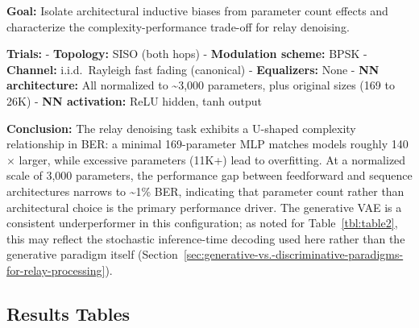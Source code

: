 \textbf{Goal:} Isolate architectural inductive biases from parameter count effects and characterize the complexity-performance trade-off for relay denoising.

\textbf{Trials:} - \textbf{Topology:} SISO (both hops) - \textbf{Modulation scheme:} BPSK - \textbf{Channel:} i.i.d.\ Rayleigh fast fading (canonical) - \textbf{Equalizers:} None - \textbf{NN architecture:} All normalized to \textasciitilde3,000 parameters, plus original sizes (169 to 26K) - \textbf{NN activation:} ReLU hidden, tanh output

\textbf{Conclusion:} The relay denoising task exhibits a U-shaped complexity relationship in BER: a minimal 169-parameter MLP matches models roughly 140$\times$ larger, while excessive parameters (11K+) lead to overfitting. At a normalized scale of 3,000 parameters, the performance gap between feedforward and sequence architectures narrows to \textasciitilde1\% BER, indicating that parameter count rather than architectural choice is the primary performance driver. The generative VAE is a consistent underperformer in this configuration; as noted for Table~\ref{tbl:table2}, this may reflect the stochastic inference-time decoding used here rather than the generative paradigm itself (Section~\ref{sec:generative-vs.-discriminative-paradigms-for-relay-processing}).

\subsection{Results Tables}\label{sec:results-tables-2}


